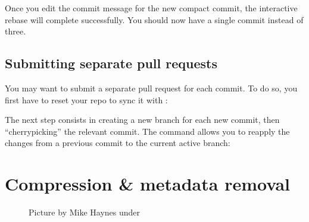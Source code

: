 \documentclass[a4paper,10pt,english,openany,oneside]{sphinxmanual}
\begin{document}
\sphinxAtStartPar
Once you edit the commit message for the new compact commit, the interactive rebase will complete successfully. You should now have a single commit instead of three.


\section{Submitting separate pull requests}
\label{\detokenize{gitinminutes:submitting-separate-pull-requests}}
\sphinxAtStartPar
You may want to submit a separate pull request for each commit. To do so, you first have to reset your  repo to sync it with :

\begin{sphinxVerbatim}[commandchars=\\\{\}]
  
   
\end{sphinxVerbatim}

\sphinxAtStartPar
The next step consists in creating a new branch for each new commit, then “cherry\sphinxhyphen{}picking” the relevant commit. The  command allows you to re\sphinxhyphen{}apply the changes from a previous commit to the current active branch:

\begin{sphinxVerbatim}[commandchars=\\\{\}]
   
  
    
\end{sphinxVerbatim}

\sphinxstepscope


\chapter{Compression \& metadata removal}
\label{\detokenize{metadata-compression:compression-metadata-removal}}\label{\detokenize{metadata-compression::doc}}
\begin{figure}[H]
\centering
\capstart

\noindent{}
\caption{Picture by Mike Haynes under \sphinxfootnotemark[9]}\label{\detokenize{metadata-compression:id1}}\end{figure}
%
\begin{footnotetext}[9]\sphinxAtStartFootnote
{}
%
\end{footnotetext}\ignorespaces 
\end{document}

